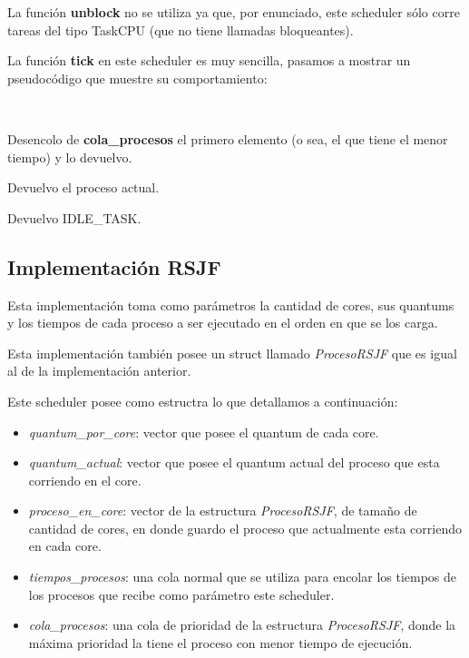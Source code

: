 La función \textbf{unblock} no se utiliza ya que, por enunciado, este scheduler sólo corre tareas del tipo TaskCPU (que no tiene llamadas bloqueantes).

La función \textbf{tick} en este scheduler es muy sencilla, pasamos a mostrar un pseudocódigo que muestre su comportamiento:

~

\begin{algorithmic}

		\State Desencolo de \textbf{cola\_procesos} el primero elemento (o sea, el que tiene el menor tiempo) y lo devuelvo.
	
		\State Devuelvo el proceso actual.

	\Else
		\State Devuelvo IDLE\_TASK.
	\EndIf
\EndFunction	
\end{algorithmic}


\subsection{Implementación \textbf{RSJF}}

Esta implementación toma como parámetros la cantidad de cores, sus quantums y los tiempos de cada proceso a ser ejecutado en el orden en que se los carga.

Esta implementación también posee un struct llamado \emph{ProcesoRSJF} que es igual al de la implementación anterior.

Este scheduler posee como estructra lo que detallamos a continuación:

\begin{itemize}

\item \emph{quantum\_por\_core}: vector que posee el quantum de cada core.

\item \emph{quantum\_actual}: vector que posee el quantum actual del proceso que esta corriendo en el core.

\item \emph{proceso\_en\_core}: vector de la estructura \emph{ProcesoRSJF}, de tamaño de cantidad de cores, en donde guardo el proceso que actualmente esta corriendo en cada core.

\item \emph{tiempos\_procesos}: una cola normal que se utiliza para encolar los tiempos de los procesos que recibe como parámetro este scheduler.

\item \emph{cola\_procesos}: una cola de prioridad de la estructura \emph{ProcesoRSJF}, donde la máxima prioridad la tiene el proceso con menor tiempo de ejecución.

\end{itemize}

